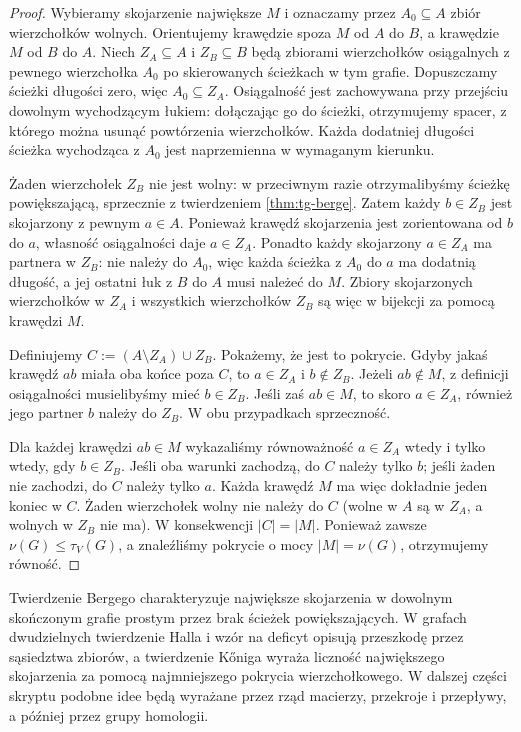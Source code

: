 \begin{proof}
Wybieramy skojarzenie największe $M$ i oznaczamy
przez $A_0\subseteq A$ zbiór wierzchołków wolnych.
Orientujemy krawędzie spoza $M$ od $A$ do $B$,
a krawędzie $M$ od $B$ do $A$. Niech $Z_A\subseteq A$
i $Z_B\subseteq B$ będą zbiorami wierzchołków
osiągalnych z pewnego wierzchołka $A_0$ po skierowanych
ścieżkach w tym grafie. Dopuszczamy ścieżki długości
zero, więc $A_0\subseteq Z_A$. Osiągalność jest
zachowywana przy przejściu dowolnym wychodzącym
łukiem: dołączając go do ścieżki, otrzymujemy spacer,
z którego można usunąć powtórzenia wierzchołków.
Każda dodatniej długości ścieżka wychodząca z $A_0$
jest naprzemienna w wymaganym kierunku.

Żaden wierzchołek $Z_B$ nie jest wolny: w przeciwnym
razie otrzymalibyśmy ścieżkę powiększającą,
sprzecznie z twierdzeniem \ref{thm:tg-berge}.
Zatem każdy $b\in Z_B$ jest skojarzony z pewnym
$a\in A$. Ponieważ krawędź skojarzenia jest
zorientowana od $b$ do $a$, własność osiągalności
daje $a\in Z_A$. Ponadto każdy skojarzony $a\in Z_A$
ma partnera w $Z_B$: nie należy do $A_0$, więc
każda ścieżka z $A_0$ do $a$ ma dodatnią długość,
a jej ostatni łuk z $B$ do $A$ musi należeć do $M$. Zbiory skojarzonych
wierzchołków w $Z_A$ i wszystkich wierzchołków
$Z_B$ są więc w bijekcji za pomocą krawędzi $M$.

Definiujemy $C:=(A\setminus Z_A)\cup Z_B$.
Pokażemy, że jest to pokrycie. Gdyby jakaś
krawędź $ab$ miała oba końce poza $C$,
to $a\in Z_A$ i $b\notin Z_B$.
Jeżeli $ab\notin M$, z definicji osiągalności
musielibyśmy mieć $b\in Z_B$. Jeśli zaś $ab\in M$,
to skoro $a\in Z_A$, również jego partner $b$
należy do $Z_B$. W obu przypadkach sprzeczność.

Dla każdej krawędzi $ab\in M$ wykazaliśmy
równoważność $a\in Z_A$ wtedy i tylko wtedy,
gdy $b\in Z_B$. Jeśli oba warunki zachodzą,
do $C$ należy tylko $b$; jeśli żaden nie zachodzi,
do $C$ należy tylko $a$. Każda krawędź $M$
ma więc dokładnie jeden koniec w $C$. Żaden wierzchołek wolny nie należy
do $C$ (wolne w $A$ są w $Z_A$, a wolnych
w $Z_B$ nie ma). W konsekwencji $|C|=|M|$.
Ponieważ zawsze $\nu(G)\le\tau_V(G)$, a znaleźliśmy
pokrycie o mocy $|M|=\nu(G)$, otrzymujemy równość.
\end{proof}

\begin{uwaga}
Twierdzenie Bergego charakteryzuje największe skojarzenia
w dowolnym skończonym grafie prostym przez brak ścieżek
powiększających. W grafach dwudzielnych twierdzenie Halla
i wzór na deficyt opisują przeszkodę przez sąsiedztwa
zbiorów, a twierdzenie Kőniga wyraża liczność największego
skojarzenia za pomocą najmniejszego pokrycia wierzchołkowego. W dalszej części skryptu
podobne idee będą wyrażane przez rząd macierzy,
przekroje i przepływy, a później przez grupy homologii.
\end{uwaga}

